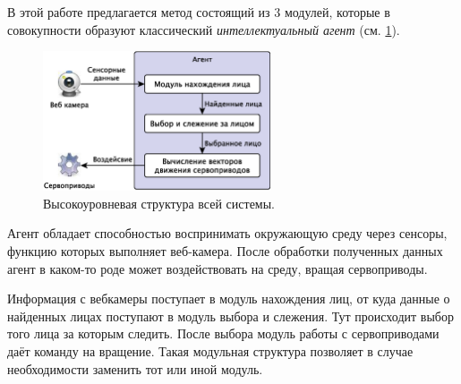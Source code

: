 \documentclass[12pt]{report}
\begin{document}
В этой работе предлагается метод состоящий из 3 модулей, которые в совокупности образуют классический \emph{интеллектуальный агент} (см. \ref{fig:agent}). 

\begin{figure}[h]
	\centering
	\includegraphics[width=0.6\textwidth]{Pictures/Agent.eps}
	\caption{Высокоуровневая структура всей системы.}
	\label{fig:agent}
\end{figure}

Агент обладает способностью воспринимать окружающую среду через сенсоры, функцию которых выполняет веб-камера. После обработки полученных данных агент в каком-то роде может воздействовать на среду, вращая сервоприводы. \citep{рассел2006искусственный}

Информация с вебкамеры поступает в модуль нахождения лиц, от куда данные о найденных лицах поступают в модуль выбора и слежения. Тут происходит выбор того лица за которым следить. После выбора модуль работы с сервоприводами даёт команду на вращение. Такая модульная структура позволяет в случае необходимости заменить тот или иной модуль. 
\end{document}
